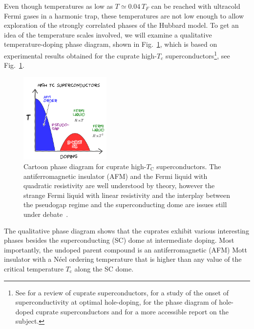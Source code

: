 Even though temperatures as low as $T\simeq 0.04\,T_{F}$ can be reached with
ultracold Fermi gases in a harmonic trap, these temperatures are not low enough
to allow exploration of the strongly correlated phases of the Hubbard model.
To get an idea of the temperature scales involved, we will examine a
qualitative temperature-doping 
phase diagram, shown in Fig.~\ref{fig:cartoon-phasediag},  which is based on
experimental results obtained for the cuprate high-$T_{c}$
superconductors\footnote{See \cite{Damascelli2003} for a review of cuprate
superconductors, \cite{He2011} for a study of the onset of superconductivity at
optimal hole-doping, \cite{Jin2011} for the phase diagram of hole-doped cuprate
superconductors and \cite{Grant2011} for a more accessible report on the
subject.}, see Fig.~\ref{fig:cartoon-phasediag}.
\begin{figure} \centering
\includegraphics[width=0.4\textwidth]{../figures/hubbard/highTc.png}
\caption[Cartoon phase diagram for cuprate high-$T_{\text{C}}$
superconductors.]{\small Cartoon phase diagram for cuprate high-$T_{\text{C}}$
superconductors. The antiferromagnetic insulator (AFM) and the Fermi liquid
with quadratic resistivity are well understood by theory, however the strange
Fermi liquid with linear resistivity and the interplay between the pseudogap
regime and the superconducting dome are issues still under
debate~\cite{Grant2011}. }
\label{fig:cartoon-phasediag}
\end{figure}

The qualitative phase diagram shows that the cuprates exhibit various
interesting phases besides the superconducting (SC) dome at intermediate
doping.   Most importantly, the undoped parent compound is an antiferromagnetic
(AFM) Mott insulator with a N\'{e}el ordering temperature that is higher than
any value of the critical temperature $T_{\text{c}}$ along the SC dome.  

